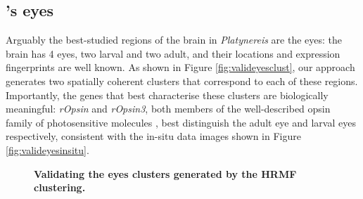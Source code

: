 		\subsection{\platy{}'s eyes}
		Arguably the best-studied regions of the brain in {\it{Platynereis}} are the eyes: the brain has 4 eyes, two larval and two adult, and their locations and expression fingerprints are well known. As shown in Figure \ref{fig:valideyesclust}, our approach generates two spatially coherent clusters that correspond to each of these regions. Importantly, the genes that best characterise these clusters are biologically meaningful: {\it{rOpsin}} and {\it{rOpsin3}}, both members of the well-described opsin family of photosensitive molecules \cite{terakita05,randel13}, best distinguish the adult eye and larval eyes respectively, consistent with the in-situ data images shown in Figure \ref{fig:valideyesinsitu}.
		
	\begin{figure}[bth]
        \myfloatalign
         \quad
        \caption{{\bf Validating the eyes clusters generated by the HRMF clustering.}}
        \label{fig:valideyes}
	\end{figure}
	
